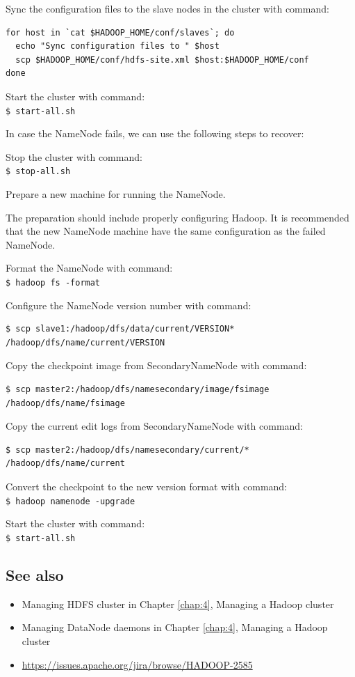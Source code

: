 Sync the configuration files to the slave nodes in the cluster with command:
\lstset{style=bashstyle}
\begin{lstlisting}
for host in `cat $HADOOP_HOME/conf/slaves`; do
  echo "Sync configuration files to " $host
  scp $HADOOP_HOME/conf/hdfs-site.xml $host:$HADOOP_HOME/conf
done
\end{lstlisting}

Start the cluster with command: \\
\verb|$ start-all.sh|

In case the NameNode fails, we can use the following steps to recover:

Stop the cluster with command: \\
\verb|$ stop-all.sh|

Prepare a new machine for running the NameNode.

The preparation should include properly configuring Hadoop. It is recommended that the new NameNode machine have the same configuration as the failed NameNode.

Format the NameNode with command: \\
\verb|$ hadoop fs -format|

Configure the NameNode version number with command:
\lstset{style=bashstyle}
\begin{lstlisting}
$ scp slave1:/hadoop/dfs/data/current/VERSION* /hadoop/dfs/name/current/VERSION
\end{lstlisting}

Copy the checkpoint image from SecondaryNameNode with command:
\lstset{style=bashstyle}
\begin{lstlisting}
$ scp master2:/hadoop/dfs/namesecondary/image/fsimage /hadoop/dfs/name/fsimage
\end{lstlisting}

Copy the current edit logs from SecondaryNameNode with command:
\lstset{style=bashstyle}
\begin{lstlisting}
$ scp master2:/hadoop/dfs/namesecondary/current/* /hadoop/dfs/name/current
\end{lstlisting}

Convert the checkpoint to the new version format with command: \\
\verb|$ hadoop namenode -upgrade|

Start the cluster with command: \\
\verb|$ start-all.sh|

\subsection*{See also}
\begin{itemize}
  \item Managing HDFS cluster in Chapter \ref{chap:4}, Managing a Hadoop cluster
  \item Managing DataNode daemons in Chapter \ref{chap:4}, Managing a Hadoop cluster
  \item \url{https://issues.apache.org/jira/browse/HADOOP-2585}
\end{itemize}

